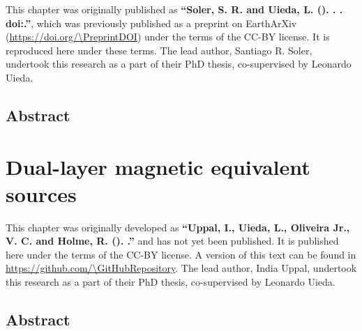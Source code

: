 \documentclass[10pt,a4paper,oneside]{book}
\begin{document}
\begingroup


\begin{summarybox}
    \noindent
    This chapter was originally published as
    \textbf{``Soler, S. R. and Uieda, L. (\Year). \Title{}. \textit{\Journal{}}.
    doi:\href{https://doi.org/\DOI}{\DOI}.''}, which was previously published
    as a preprint on EarthArXiv (\url{https://doi.org/\PreprintDOI}) under the
    terms of the CC-BY license. It is reproduced here under these terms.
    The lead author, Santiago R. Soler, undertook this research as a part of
    their PhD thesis, co-supervised by Leonardo Uieda.
\end{summarybox}

\section*{Abstract}


% 
% 
\endgroup

\chapter{Dual-layer magnetic equivalent sources}
\label{chap_eqsdual}

\begingroup


\begin{summarybox}
    \noindent
    This chapter was originally developed as
    \textbf{``Uppal, I., Uieda, L., Oliveira Jr., V. C. and Holme, R. (\Year).
    \Title{}.''} and has not yet been published.
    It is published here under the terms of the CC-BY license.
    A version of this text can be found in
    \url{https://github.com/\GitHubRepository}.
    The lead author, India Uppal, undertook this research as a part of
    their PhD thesis, co-supervised by Leonardo Uieda.
\end{summarybox}

\section*{Abstract}


% 
\endgroup

\end{document}
